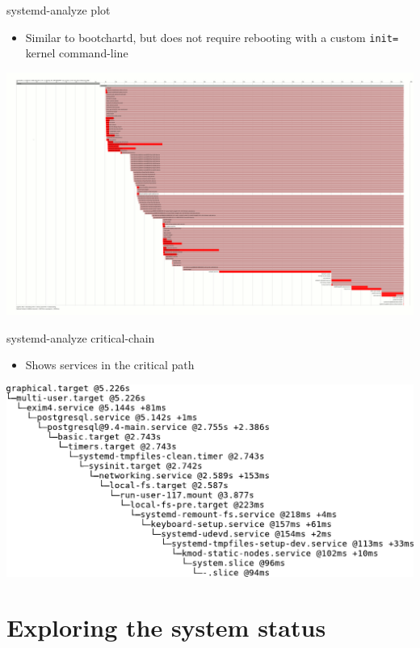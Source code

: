 \documentclass[11pt,final,usepdftitle=false]{beamer}
\begin{document}
\begin{frame}{systemd-analyze plot}
	\hbr
	\begin{itemize}
		\item Similar to bootchartd, but does not require rebooting with a custom \texttt{init=} kernel command-line
	\end{itemize}
	\includegraphics[width=\textwidth]{figs/systemd-analyze-plot.png}
\end{frame}

\begin{frame}[fragile]{systemd-analyze critical-chain}
	\begin{itemize}
		\item Shows services in the critical path
	\end{itemize}
	\includegraphics[width=\textwidth]{figs/systemd-analyze-critical-chain.pdf}
\end{frame}

\section{Exploring the system status}
\end{document}
